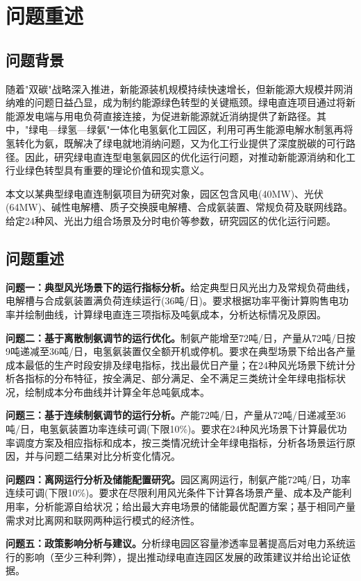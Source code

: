 \section{问题重述}

\subsection{问题背景}

随着"双碳"战略深入推进，新能源装机规模持续快速增长，但新能源大规模并网消纳难的问题日益凸显，成为制约能源绿色转型的关键瓶颈\cite{ndrc2024,liu2015}。绿电直连项目通过将新能源发电端与用电负荷直接连接，为促进新能源就近消纳提供了新路径。其中，"绿电—绿氢—绿氨"一体化电氢氨化工园区，利用可再生能源电解水制氢再将氢转化为氨，既解决了绿电就地消纳问题，又为化工行业提供了深度脱碳的可行路径\cite{wang2024}。因此，研究绿电直连型电氢氨园区的优化运行问题，对推动新能源消纳和化工行业绿色转型具有重要的理论价值和现实意义。

本文以某典型绿电直连制氨项目为研究对象，园区包含风电(40MW)、光伏(64MW)、碱性电解槽、质子交换膜电解槽、合成氨装置、常规负荷及联网线路。给定24种风、光出力组合场景及分时电价等参数，研究园区的优化运行问题。

\subsection{问题重述}

\textbf{问题一：典型风光场景下的运行指标分析。}给定典型日风光出力及常规负荷曲线，电解槽与合成氨装置满负荷连续运行(36吨/日)。要求根据功率平衡计算购售电功率并绘制曲线，计算绿电直连三项指标及吨氨成本，分析达标情况及原因。

\textbf{问题二：基于离散制氨调节的运行优化。}制氨产能增至72吨/日，产量从72吨/日按9吨递减至36吨/日，电氢氨装置仅全额开机或停机。要求在典型场景下给出各产量成本最低的生产时段安排及绿电指标，找出最优日产量；在24种风光场景下统计分析各指标的分布特征，按全满足、部分满足、全不满足三类统计全年绿电指标状况，绘制成本分布曲线并计算全年总吨氨成本。

\textbf{问题三：基于连续制氨调节的运行分析。}产能72吨/日，产量从72吨/日递减至36吨/日，电氢氨装置功率连续可调(下限10\%)。要求在24种风光场景下计算最优功率调度方案及相应指标和成本，按三类情况统计全年绿电指标，分析各场景运行原因，并与问题二结果对比分析变化情况。

\textbf{问题四：离网运行分析及储能配置研究。}园区离网运行，制氨产能72吨/日，功率连续可调(下限10\%)。要求在尽限利用风光条件下计算各场景产量、成本及产能利用率，分析能源自给状况；给出最大弃电场景的储能最优配置方案；基于相同产量需求对比离网和联网两种运行模式的经济性。

\textbf{问题五：政策影响分析与建议。}分析绿电园区容量渗透率显著提高后对电力系统运行的影响（至少三种利弊），提出推动绿电直连园区发展的政策建议并给出论证依据。
